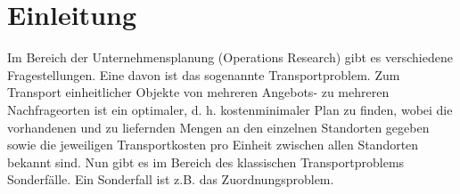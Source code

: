 %
%
%
\section{Einleitung\label{munkres:section:teil0}}

Im Bereich der Unternehmensplanung (Operations Research) gibt es verschiedene Fragestellungen. Eine davon ist das sogenannte Transportproblem. Zum Transport einheitlicher Objekte von mehreren Angebots- zu mehreren Nachfrageorten ist ein optimaler, d. h. kostenminimaler Plan zu finden, wobei die vorhandenen und zu liefernden Mengen an den einzelnen Standorten gegeben sowie die jeweiligen Transportkosten pro Einheit zwischen allen Standorten bekannt sind.
Nun gibt es im Bereich des klassischen Transportproblems Sonderfälle. Ein Sonderfall ist z.B. das Zuordnungsproblem.
